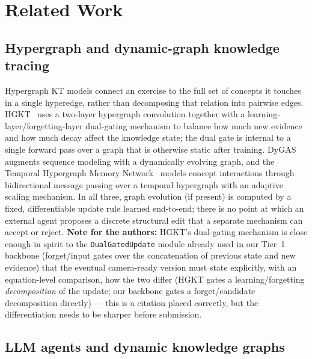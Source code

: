 \documentclass[review,12pt]{elsarticle}
\begin{document}
\section{Related Work}

\subsection{Hypergraph and dynamic-graph knowledge tracing}

Hypergraph KT models connect an exercise to the full set of concepts it
touches in a single hyperedge, rather than decomposing that relation into
pairwise edges. HGKT~\cite{lei2025hgkt} uses a two-layer hypergraph
convolution together with a learning-layer/forgetting-layer dual-gating
mechanism to balance how much new evidence and how much decay affect the
knowledge state; the dual gate is internal to a single forward pass over
a graph that is otherwise static after training. DyGAS~\cite{li2025dygas}
augments sequence modeling with a dynamically evolving graph, and the
Temporal Hypergraph Memory Network~\cite{mohammadi2025thmn} models
concept interactions through bidirectional message passing over a
temporal hypergraph with an adaptive scaling mechanism. In all three,
graph evolution (if present) is computed by a fixed, differentiable
update rule learned end-to-end; there is no point at which an external
agent proposes a discrete structural edit that a separate mechanism can
accept or reject. \textbf{Note for the authors:} HGKT's dual-gating
mechanism is close enough in spirit to the \texttt{DualGatedUpdate}
module already used in our Tier~1 backbone (forget/input gates over the
concatenation of previous state and new evidence) that the eventual
camera-ready version must state explicitly, with an equation-level
comparison, how the two differ (HGKT gates a learning/forgetting
\emph{decomposition} of the update; our backbone gates a
forget/candidate decomposition directly) --- this is a citation
placed correctly, but the differentiation needs to be sharper before
submission.

\subsection{LLM agents and dynamic knowledge graphs}
\end{document}
